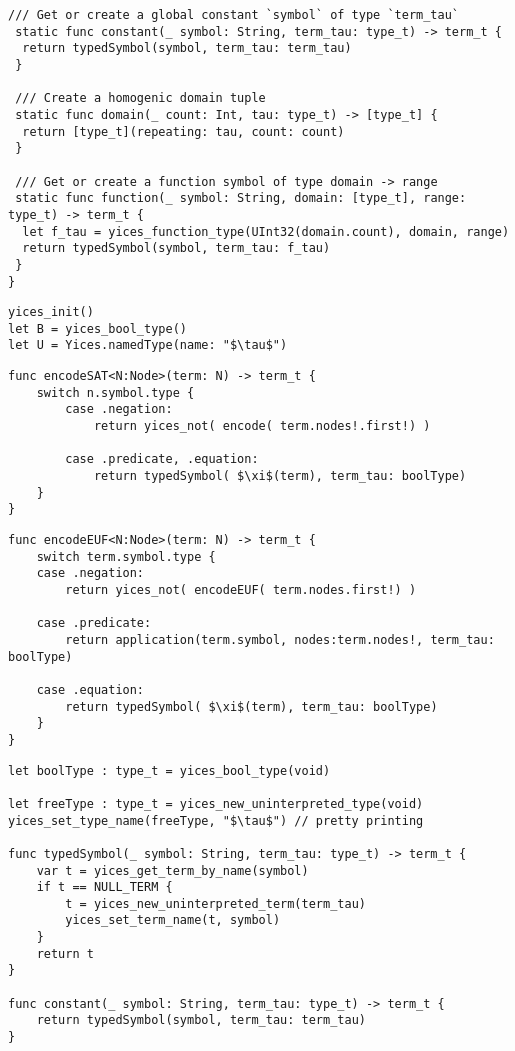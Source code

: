 \begin{lstlisting}[language=FLEA]
 /// Get or create a global constant `symbol` of type `term_tau`
 static func constant(_ symbol: String, term_tau: type_t) -> term_t {
  return typedSymbol(symbol, term_tau: term_tau)
 }

 /// Create a homogenic domain tuple
 static func domain(_ count: Int, tau: type_t) -> [type_t] {
  return [type_t](repeating: tau, count: count)
 }

 /// Get or create a function symbol of type domain -> range
 static func function(_ symbol: String, domain: [type_t], range: type_t) -> term_t {
  let f_tau = yices_function_type(UInt32(domain.count), domain, range)
  return typedSymbol(symbol, term_tau: f_tau)
 }
}
\end{lstlisting}

\begin{lstlisting}[language=FLEA, caption={SMT encoding}]
yices_init()
let B = yices_bool_type()
let U = Yices.namedType(name: "$\tau$")
\end{lstlisting}

\begin{lstlisting}[language=FLEA, caption={Propositional encoding}]
func encodeSAT<N:Node>(term: N) -> term_t {
	switch n.symbol.type {
		case .negation:
			return yices_not( encode( term.nodes!.first!) )

		case .predicate, .equation:
			return typedSymbol( $\xi$(term), term_tau: boolType)
	}
}
\end{lstlisting}

\begin{lstlisting}[language=FLEA, caption={EUF encoding}]
func encodeEUF<N:Node>(term: N) -> term_t {
	switch term.symbol.type {
	case .negation:
		return yices_not( encodeEUF( term.nodes.first!) )

	case .predicate:
		return application(term.symbol, nodes:term.nodes!, term_tau: boolType)

	case .equation:
		return typedSymbol( $\xi$(term), term_tau: boolType)
	}
}
\end{lstlisting}


\begin{lstlisting}[language=flea, caption={Yices types, symbols, and constants}]
let boolType : type_t = yices_bool_type(void)

let freeType : type_t = yices_new_uninterpreted_type(void)
yices_set_type_name(freeType, "$\tau$") // pretty printing

func typedSymbol(_ symbol: String, term_tau: type_t) -> term_t {
	var t = yices_get_term_by_name(symbol)
	if t == NULL_TERM {
		t = yices_new_uninterpreted_term(term_tau)
		yices_set_term_name(t, symbol)
	}
	return t
}

func constant(_ symbol: String, term_tau: type_t) -> term_t {
	return typedSymbol(symbol, term_tau: term_tau)
}
\end{lstlisting}




